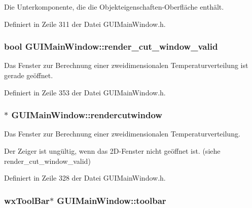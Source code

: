 Die Unterkomponente, die die Objekteigenschaften-\/\-Oberfläche enthält. 



Definiert in Zeile 311 der Datei G\-U\-I\-Main\-Window.\-h.

\hypertarget{classGUIMainWindow_a4f08d8e4294955a3cc0b071dd3cad0d2}{
\subsubsection[{render\-\_\-cut\-\_\-window\-\_\-valid}]{\setlength{\rightskip}{0pt plus 5cm}bool G\-U\-I\-Main\-Window\-::render\-\_\-cut\-\_\-window\-\_\-valid\hspace{0.3cm}{\ttfamily [private]}}}\label{classGUIMainWindow_a4f08d8e4294955a3cc0b071dd3cad0d2}


Das Fenster zur Berechnung einer zweidimensionalen Temperaturverteilung ist gerade geöffnet. 



Definiert in Zeile 353 der Datei G\-U\-I\-Main\-Window.\-h.

\hypertarget{classGUIMainWindow_a649cb92f27688772174659601188ac2d}{
\subsubsection[{rendercutwindow}]{$\ast$ G\-U\-I\-Main\-Window\-::rendercutwindow\hspace{0.3cm}{\ttfamily [private]}}}\label{classGUIMainWindow_a649cb92f27688772174659601188ac2d}


Das Fenster zur Berechnung einer zweidimensionalen Temperaturverteilung. 

Der Zeiger ist ungültig, wenn das 2\-D-\/\-Fenster nicht geöffnet ist. (siehe render\-\_\-cut\-\_\-window\-\_\-valid) 

Definiert in Zeile 328 der Datei G\-U\-I\-Main\-Window.\-h.

\hypertarget{classGUIMainWindow_a8a8638fa87b4080e2242812f3d7e469e}{
\subsubsection[{toolbar}]{\setlength{\rightskip}{0pt plus 5cm}wx\-Tool\-Bar$\ast$ G\-U\-I\-Main\-Window\-::toolbar\hspace{0.3cm}{\ttfamily [private]}}}\label{classGUIMainWindow_a8a8638fa87b4080e2242812f3d7e469e}



